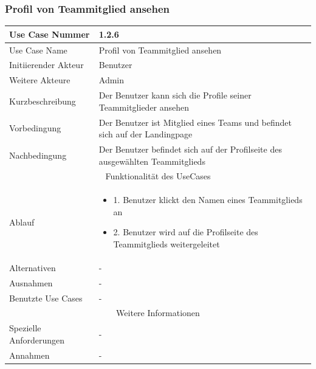 \documentclass[10pt,a4paper]{article}
\begin{document}
		\subsubsection{Profil von Teammitglied ansehen}
		\begin{tabular}{|l|p{.5\linewidth}|}
			\hline Use Case Nummer & 1.2.6 \\ 
			\hline Use Case Name & Profil von Teammitglied ansehen \\ 
			\hline Initiierender Akteur & Benutzer \\
			\hline Weitere Akteure & Admin \\
			\hline Kurzbeschreibung & Der Benutzer kann sich die Profile seiner Teammitglieder ansehen \\
			\hline Vorbedingung & Der Benutzer ist Mitglied eines Teams und befindet sich auf der Landingpage \\
			\hline Nachbedingung & Der Benutzer befindet sich auf der Profilseite des ausgewählten Teammitglieds \\
			\hline \multicolumn{2}{|c|}{Funktionalität des UseCases}\\
			\hline Ablauf & \begin{itemize}
				\item 1. Benutzer klickt den Namen eines Teammitglieds an
				\item 2. Benutzer wird auf die Profilseite des Teammitglieds weitergeleitet
			\end{itemize} \\
			\hline Alternativen & - \\
			\hline Ausnahmen & - \\
			\hline Benutzte Use Cases & - \\
			\hline \multicolumn{2}{|c|}{Weitere Informationen} \\
			\hline Spezielle Anforderungen & - \\
			\hline Annahmen & - \\
			\hline
		\end{tabular}
					
\end{document}
